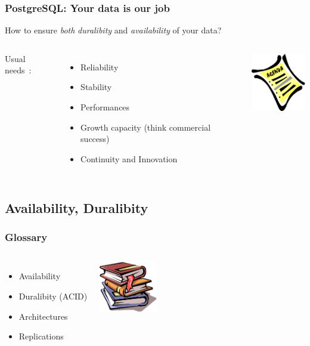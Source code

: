 \documentclass[english]{beamer}
\begin{document}
\begin{frame}[fragile]
  \frametitle{PostgreSQL: Your data is our job}

  \begin{center}
    How to ensure \emph{both} \textit{duralibity} and \textit{availability}
    of your data?
  \end{center}
  \vfill

\begin{columns}[c]

  Usual needs :

  \begin{itemize}
   \item Reliability
   \item Stability
   \item Performances
   \item Growth capacity (think commercial success)
   \item Continuity and Innovation
  \end{itemize}  

\begin{center}
  \includegraphics[height=7em]{agenda.jpg}
\end{center}
\end{columns}
\end{frame}

\subsection{Availability, Duralibity}
\frame{\tableofcontents[currentsubsection]}

\begin{frame}
  \frametitle{Glossary}
  
  \vfill

\begin{columns}[c]

  \begin{itemize}
    \item Availability 
    \item Duralibity (ACI\alert{D})
    \item Architectures
    \item Replications
  \end{itemize}  

\includegraphics[height=6em]{glossaire.jpg}
\end{columns}
\end{frame}
\end{document}
